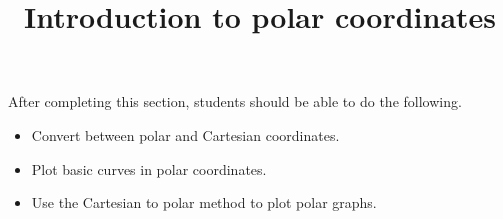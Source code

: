 \documentclass{ximera}
\title{Introduction to polar coordinates}
\begin{document}
\begin{abstract}
\end{abstract}

\maketitle

\begin{sectionOutcomes}

After completing this section, students should be able to do the following.

\begin{itemize}
\item Convert between polar and Cartesian coordinates.
\item Plot basic curves in polar coordinates.
\item Use the Cartesian to polar method to plot polar graphs.
\end{itemize}

\end{sectionOutcomes}
\end{document}
